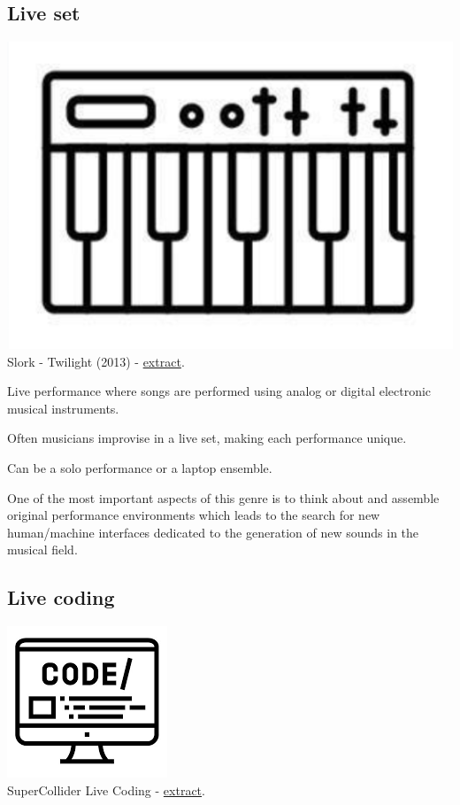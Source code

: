 \subsection{Live set }\label{live-set}

\begin{center}
\includegraphics[scale=0.3]{../img/lset.png}\\
Slork - Twilight (2013) - \href{https://github.com/musicaecodice/EMC/blob/main/2_instruments/suoni/slork1.mp4}{extract}.
\end{center}

Live performance where songs are performed using analog or digital electronic musical instruments.

Often musicians improvise in a live set, making each performance unique.

Can be a solo performance or a laptop ensemble.

One of the most important aspects of this genre is to think about and assemble original performance environments which leads to the search for new human/machine interfaces dedicated to the generation of new sounds in the musical field.

\subsection{Live coding}\label{live-coding}

\begin{center}
\includegraphics[scale=0.4]{../img/lcod.png}\\
SuperCollider Live Coding - \href{https://github.com/musicaecodice/EMC/blob/main/2_instruments/suoni/livec1.mp4}{extract}.
\end{center}

